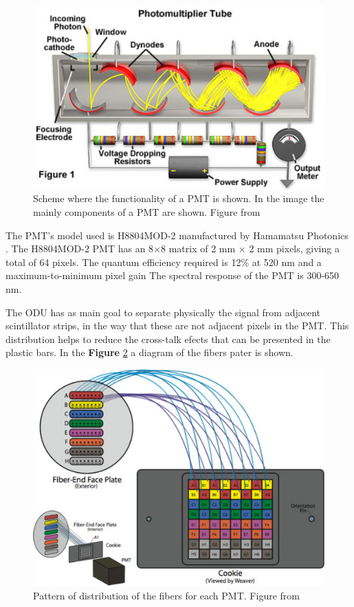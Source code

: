 \begin{figure}[!htb]
    \centering
    \includegraphics[scale=0.5]{Figures/Chapter2/PMT.png}
    \caption{Scheme where the functionality of a PMT is shown. In the image the mainly components of a PMT are shown. Figure from \cite{PMTHamamatsu}}
    \label{fig:MnvExp:MnvDetector:PMTfunctionality}
\end{figure}



The PMT's model used is H8804MOD-2 manufactured by Hamamatsu Photonics \cite{hamamatsu2007photomultiplier}. The H8804MOD-2 PMT has an 8$\times$8 matrix of 2 mm $\times$ 2 mm pixels, giving a total of 64 pixels. The quantum efficiency required is 12\% at 520 nm and a maximum-to-minimum pixel gain  The spectral response of the PMT is 300-650 nm.    

The ODU has as main goal to separate physically the signal from adjacent scintillator strips, in the way that these are not adjacent pixels in the PMT. This distribution helps to reduce the cross-talk efects that can be presented in the plastic bars. In the \textbf{Figure} \ref{fig:MnvExp:MnvDetector:ODU} a diagram of the fibers pater is shown. 

\begin{figure}[!htb]
    \centering
    \includegraphics{Figures/Chapter2/ODU.jpg}
    \caption{Pattern of distribution of the fibers for each PMT. Figure from \cite{ALIAGA2014130}}
    \label{fig:MnvExp:MnvDetector:ODU}
\end{figure}


